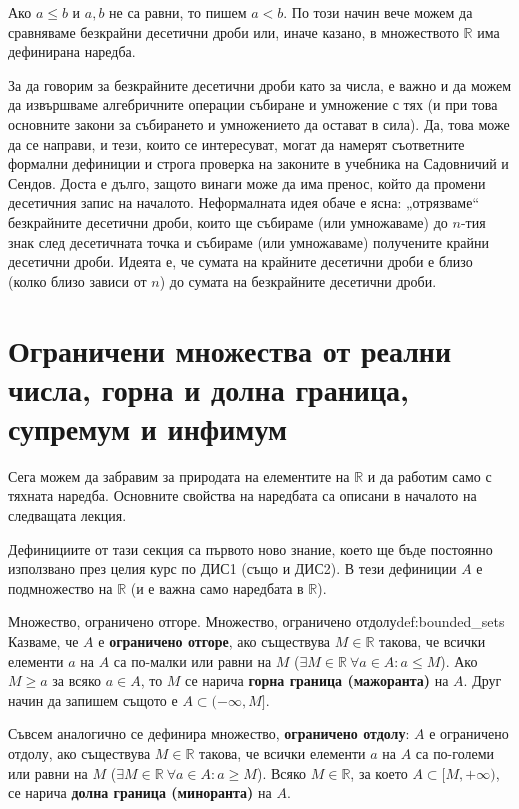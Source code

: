 Ако $a \le b$ и $a, b$ не са равни, то пишем $a < b$. По този начин вече можем да сравняваме безкрайни десетични дроби или, иначе казано, в множеството $\mathbb{R}$ има дефинирана наредба.

За да говорим за безкрайните десетични дроби като за числа, е важно и да можем да извършваме алгебричните операции събиране и умножение с тях (и при това основните закони за събирането и умножението да остават в сила). Да, това може да се направи, и тези, които се интересуват, могат да намерят съответните формални дефиниции и строга проверка на законите в учебника на Садовничий и Сендов. Доста е дълго, защото винаги може да има пренос, който да промени десетичния запис на началото. Неформалната идея обаче е ясна: „отрязваме“ безкрайните десетични дроби, които ще събираме (или умножаваме) до $n$-тия знак след десетичната точка и събираме (или умножаваме) получените крайни десетични дроби. Идеята е, че сумата на крайните десетични дроби е близо (колко близо зависи от $n$) до сумата на безкрайните десетични дроби.

\section{Ограничени множества от реални числа, горна и долна граница, супремум и инфимум}

Сега можем да забравим за природата на елементите на $\mathbb{R}$ и да работим само с тяхната наредба. Основните свойства на наредбата са описани в началото на следващата лекция.

Дефинициите от тази секция са първото ново знание, което ще бъде постоянно използвано през целия курс по ДИС1 (също и ДИС2). В тези дефиниции $A$ е подмножество на $\mathbb{R}$ (и е важна само наредбата в $\mathbb{R}$).

\begin{definition}{Множество, ограничено отгоре. Множество, ограничено отдолу}{def:bounded_sets}
Казваме, че $A$ е \textbf{ограничено отгоре}, ако съществува $M \in \mathbb{R}$ такова, че всички елементи $a$ на $A$ са по-малки или равни на $M$ ($\exists M \in \mathbb{R} \ \forall a \in A : a \le M$). Ако $M \ge a$ за всяко $a \in A$, то $M$ се нарича \textbf{горна граница (мажоранта)} на $A$. Друг начин да запишем същото е $A \subset (-\infty, M]$.

Съвсем аналогично се дефинира множество, \textbf{ограничено отдолу}: $A$ е ограничено отдолу, ако съществува $M \in \mathbb{R}$ такова, че всички елементи $a$ на $A$ са по-големи или равни на $M$ ($\exists M \in \mathbb{R} \ \forall a \in A : a \ge M$). Всяко $M \in \mathbb{R}$, за което $A \subset [M, +\infty)$, се нарича \textbf{долна граница (миноранта)} на $A$.
\end{definition}

